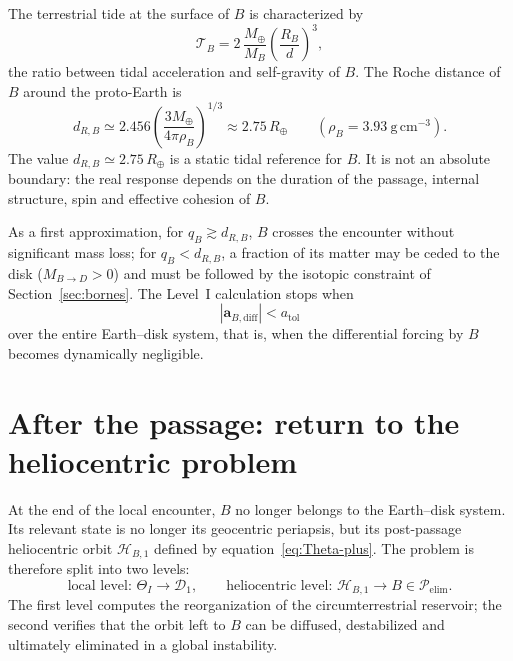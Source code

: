 \documentclass[11pt,a4paper,openany]{report}
\newcommand{\Mt}{M_{\oplus}}
\newcommand{\Rt}{R_{\oplus}}
\begin{document}
The terrestrial tide at the surface of $B$ is characterized by
\begin{equation}
\mathcal{T}_B=2\,\frac{\Mt}{M_B}\left(\frac{R_B}{d}\right)^3,
\label{eq:TB}
\end{equation}
the ratio between tidal acceleration and self-gravity of $B$. The Roche distance of $B$ around the
proto-Earth is
\begin{equation}
d_{R,B}\simeq2.456\left(\frac{3\Mt}{4\pi\rho_B}\right)^{1/3}\approx2.75\,\Rt
\qquad(\rho_B=3.93\ \mathrm{g\,cm^{-3}}).
\label{eq:RocheB}
\end{equation}
The value $d_{R,B}\simeq2.75\,\Rt$ is a static tidal reference for $B$. It is not an absolute
boundary: the real response depends on the duration of the passage, internal structure, spin and
effective cohesion of $B$.

As a first approximation, for $q_B\gtrsim d_{R,B}$, $B$ crosses the encounter without significant
mass loss; for $q_B<d_{R,B}$, a fraction of its matter may be ceded to the disk ($M_{B\to D}>0$)
and must be followed by the isotopic constraint of Section~\ref{sec:bornes}. The Level~I
calculation stops when
\begin{equation}
|\mathbf{a}_{B,\mathrm{diff}}|<a_{\mathrm{tol}}
\label{eq:atol}
\end{equation}
over the entire Earth--disk system, that is, when the differential forcing by $B$ becomes
dynamically negligible.

\section{After the passage: return to the heliocentric problem}
\label{sec:retour-heliocentrique}

At the end of the local encounter, $B$ no longer belongs to the Earth--disk system. Its relevant
state is no longer its geocentric periapsis, but its post-passage heliocentric orbit
$\mathcal{H}_{B,1}$ defined by equation~\eqref{eq:Theta-plus}. The problem is therefore split into
two levels:
\begin{equation}
\boxed{\;\text{local level: } \Theta_I\to\mathcal{D}_1,
\qquad
\text{heliocentric level: } \mathcal{H}_{B,1}\to B\in\mathcal{P}_{\mathrm{elim}}.\;}
\label{eq:deux-niveaux-B}
\end{equation}
The first level computes the reorganization of the circumterrestrial reservoir; the second verifies
that the orbit left to $B$ can be diffused, destabilized and ultimately eliminated in a global
instability.
\end{document}
